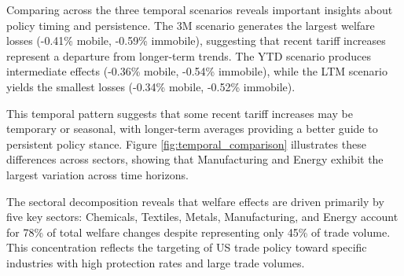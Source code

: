 Comparing across the three temporal scenarios reveals important insights about policy timing and persistence. The 3M scenario generates the largest welfare losses (-0.41\% mobile, -0.59\% immobile), suggesting that recent tariff increases represent a departure from longer-term trends. The YTD scenario produces intermediate effects (-0.36\% mobile, -0.54\% immobile), while the LTM scenario yields the smallest losses (-0.34\% mobile, -0.52\% immobile).

This temporal pattern suggests that some recent tariff increases may be temporary or seasonal, with longer-term averages providing a better guide to persistent policy stance. Figure \ref{fig:temporal_comparison} illustrates these differences across sectors, showing that Manufacturing and Energy exhibit the largest variation across time horizons.

The sectoral decomposition reveals that welfare effects are driven primarily by five key sectors: Chemicals, Textiles, Metals, Manufacturing, and Energy account for 78\% of total welfare changes despite representing only 45\% of trade volume. This concentration reflects the targeting of US trade policy toward specific industries with high protection rates and large trade volumes.
